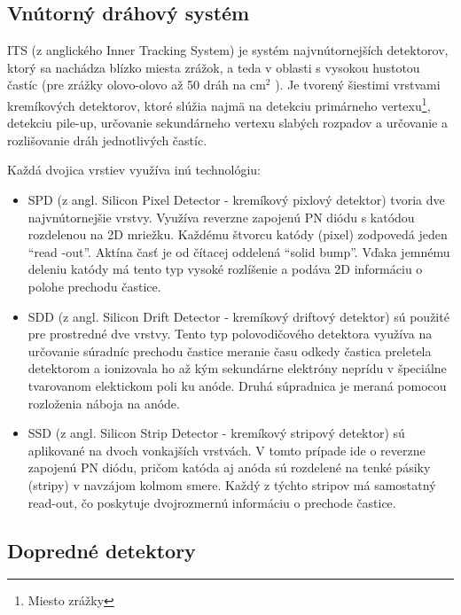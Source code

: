 \documentclass[thesismargins, thesislinespacing]{rnthesis}
\begin{document}
\subsection{Vnútorný dráhový systém}

ITS (z anglického Inner Tracking System) je systém najvnútornejších detektorov, ktorý sa nachádza blízko miesta zrážok, a teda v oblasti s vysokou hustotou častíc (pre zrážky olovo-olovo až 50 dráh na $\mathrm{cm}^2$ ). Je tvorený šiestimi vrstvami kremíkových detektorov, ktoré slúžia najmä na detekciu primárneho vertexu\footnote{Miesto zrážky}, detekciu pile-up, určovanie sekundárneho vertexu slabých rozpadov a určovanie a rozlišovanie dráh jednotlivých častíc. 

Každá dvojica vrstiev využíva inú technológiu:
\begin{itemize}
	\item SPD (z angl. Silicon Pixel Detector - kremíkový pixlový detektor) tvoria dve najvnútornejšie vrstvy. Využíva reverzne zapojenú PN diódu s katódou rozdelenou na 2D mriežku. Každému štvorcu katódy (pixel) zodpovedá jeden “read -out”. Aktína časť je od čítacej oddelená “solid bump”. Vďaka jemnému deleniu katódy má tento typ vysoké rozlíšenie a podáva 2D informáciu o polohe prechodu častice. 
	\item SDD (z angl. Silicon Drift Detector - kremíkový driftový detektor) sú použité pre prostredné dve vrstvy. Tento typ polovodičového detektora využíva na určovanie súradníc prechodu častice meranie času odkedy častica preletela detektorom a ionizovala ho až kým sekundárne elektróny neprídu v špeciálne tvarovanom elektickom poli ku anóde. Druhá súpradnica je meraná pomocou rozloženia náboja na anóde.
	\item SSD (z angl. Silicon Strip Detector - kremíkový stripový detektor) sú aplikované na dvoch vonkajších vrstvách. V tomto prípade ide o reverzne zapojenú PN diódu, pričom katóda aj anóda sú rozdelené na tenké pásiky (stripy) v navzájom kolmom smere. Každý z týchto stripov má samostatný read-out, čo poskytuje dvojrozmernú informáciu o prechode častice. 
\end{itemize}
\subsection{Dopredné detektory}
\end{document}
